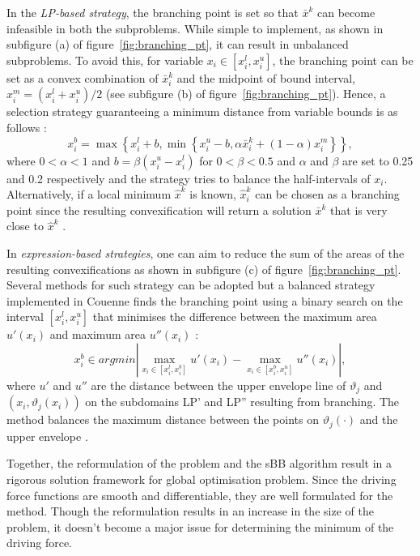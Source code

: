 \begin{enumerate}
\begin{enumerate}
		In the \emph{LP-based strategy}, the branching point is set so that $\bar{x}^k$ can become infeasible in both the subproblems. While simple to implement, as shown in subfigure (a) of figure~\ref{fig:branching_pt}, it can result in unbalanced subproblems. To avoid this, for variable $x_i \in [x_i^l, x_i^u]$, the branching point can be set as a convex combination of $\bar{x}_i^k$ and the midpoint of bound interval, $x_i^m = (x_i^l + x_i^u) / 2$ (see subfigure (b) of figure~\ref{fig:branching_pt}). Hence, a selection strategy guaranteeing a minimum distance from variable bounds is as follows \cite{Tawarmalani:2013aa}:
		\[
			x_i^b = \max \left \{x_i^l +b, \min \left \{x_i^u -b, \alpha \bar{x}_i^k + \left(1-\alpha\right)x_i^m \right \} \right \},
		\]
		where $0 < \alpha < 1$ and $b = \beta(x_i^u - x_i^l)$ for $0 < \beta < 0.5$ and $\alpha$ and $\beta$ are set to \num{0.25} and \num{0.2} respectively \cite{Belotti:2009aa} and  the strategy tries to balance the half-intervals of $x_i$. Alternatively, if a local minimum $\hat{x}^k$ is known, $\hat{x}_i^k$ can be chosen as a branching point since the resulting convexification will return a solution $\bar{x}^k$ that is very close to $\hat{x}^k$ \cite{Shectman:1998aa}.
		
	In \emph{expression-based strategies}, one can aim to reduce the sum of the areas of the resulting convexifications as shown in subfigure (c) of figure~\ref{fig:branching_pt}. Several methods for such strategy can be adopted \cite{Kalantari:1987aa,Liu:1996aa} but a balanced strategy implemented in Couenne finds the branching point using a binary search on the interval $[x_i^l, x_i^u]$ that minimises the difference between the maximum area $u'(x_i)$ and maximum area $u''(x_i)$ \cite{Belotti:2009aa}:
	\[
		x_i^b \in argmin \left | \max_{x_i \in [x_i^l, x_i^b]} u'(x_i) - \max_{x_i \in [x_i^b, x_i^u]} u''(x_i) \right|,
	\]
	where $u'$ and $u''$ are the distance between the upper envelope line of $\vartheta_j$ and $(x_i, \vartheta_j(x_i))$ on the subdomains LP' and LP'' resulting from branching. The method balances the maximum distance between the points on $\vartheta_j(\cdot)$ and the upper envelope \cite{Belotti:2022aa}.
		\end{enumerate}	
\end{enumerate}

	  Together, the reformulation of the problem and the sBB algorithm result in a rigorous solution framework for global optimisation problem. Since the driving force functions are smooth and differentiable, they are well formulated for the method. Though the reformulation results in an increase in the size of the problem, it doesn't become a major issue for determining the minimum of the driving force.
	  
